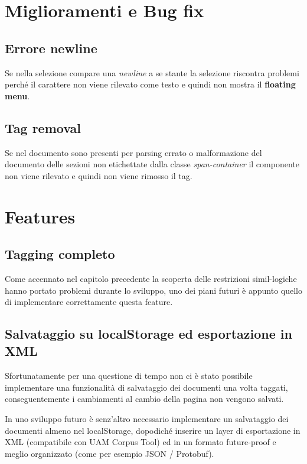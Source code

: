 \documentclass[twoside]{supsistudent}
\begin{document}
\section{Miglioramenti e Bug fix}

\subsection{Errore newline}

Se nella selezione compare una \textit{newline} a se stante la selezione 
riscontra problemi perché il carattere non viene rilevato come testo e quindi
non mostra il \textbf{floating menu}.

\subsection{Tag removal}

Se nel documento sono presenti per parsing errato o malformazione del documento
delle sezioni non etichettate dalla classe \textit{span-container} il 
componente non viene rilevato e quindi non viene rimosso il tag.

\section{Features}

\subsection{Tagging completo}

Come accennato nel capitolo precedente la scoperta delle restrizioni
simil-logiche hanno portato problemi durante lo sviluppo, uno dei piani futuri
è appunto quello di implementare correttamente questa feature.

\subsection{Salvataggio su localStorage ed esportazione in XML}

Sfortunatamente per una questione di tempo non ci è stato possibile 
implementare una funzionalità di salvataggio dei documenti una volta taggati,
conseguentemente i cambiamenti al cambio della pagina non vengono salvati.

In uno sviluppo futuro è senz'altro necessario implementare un salvataggio
dei documenti almeno nel localStorage, dopodiché inserire un layer di
esportazione in XML (compatibile con UAM Corpus Tool) ed in un formato
future-proof e meglio organizzato (come per esempio JSON / Protobuf).
\end{document}
